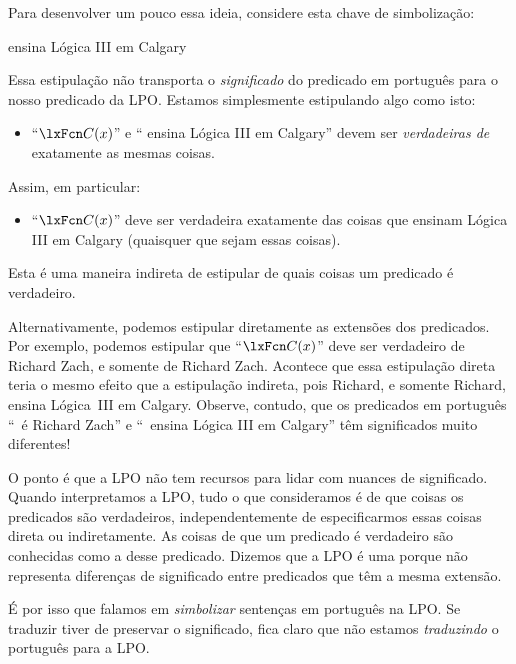 Para desenvolver um pouco essa ideia, considere esta chave de simbolização:
	\begin{ekey}
\item[\atom{C}{x}]  ensina Lógica III em Calgary
	\end{ekey}
Essa estipulação não transporta o \emph{significado} do predicado em português para o nosso predicado da LPO. Estamos simplesmente estipulando algo como isto:
	\begin{itemize}
\item \textquotedblleft $\atom{C}{x}$\textquotedblright{} e \textquotedblleft {} ensina Lógica III em Calgary\textquotedblright{} devem ser \emph{verdadeiras de} exatamente as mesmas coisas.
	\end{itemize}
Assim, em particular:
	\begin{itemize}
\item \textquotedblleft $\atom{C}{x}$\textquotedblright{} deve ser verdadeira exatamente das coisas que ensinam Lógica III em Calgary (quaisquer que sejam essas coisas).
	\end{itemize}
Esta é uma maneira indireta de estipular de quais coisas um predicado é verdadeiro.

Alternativamente, podemos estipular diretamente as extensões dos predicados. Por exemplo, podemos estipular que \textquotedblleft $\atom{C}{x}$\textquotedblright{} deve ser verdadeiro de Richard Zach, e somente de Richard Zach. Acontece que essa estipulação direta teria o mesmo efeito que a estipulação indireta, pois Richard, e somente Richard, ensina Lógica~III em Calgary. Observe, contudo, que os predicados em português \textquotedblleft \blank\ é Richard Zach\textquotedblright{} e \textquotedblleft \blank\ ensina Lógica III em Calgary\textquotedblright{} têm significados muito diferentes!

O ponto é que a LPO não tem recursos para lidar com nuances de significado. Quando interpretamos a LPO, tudo o que consideramos é de que coisas os predicados são verdadeiros, independentemente de especificarmos essas coisas direta ou indiretamente. As coisas de que um predicado é verdadeiro são conhecidas como a  desse predicado. Dizemos que a LPO é uma  porque não representa diferenças de significado entre predicados que têm a mesma extensão.

É por isso que falamos em \emph{simbolizar} sentenças em português na LPO. Se traduzir tiver de preservar o significado, fica claro que não estamos \emph{traduzindo} o português para a LPO.


